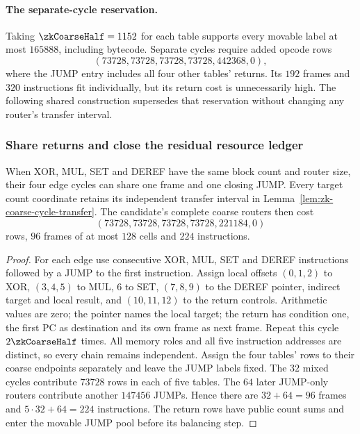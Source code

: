 \paragraph{The separate-cycle reservation.} Taking $\zkCoarseHalf=1152$ for each table supports every movable label at most $165888$, including bytecode. Separate cycles require added opcode rows
\[
 (73728,73728,73728,73728,442368,0),
\]
where the JUMP entry includes all four other tables' returns. Its $192$ frames and $320$ instructions fit individually, but its return cost is unnecessarily high. The following shared construction supersedes that reservation without changing any router's transfer interval.

\subsubsection{Share returns and close the residual resource ledger}

\begin{proposition}\label{prop:zk-shared-coarse-routers}
When XOR, MUL, SET and DEREF have the same block count and router size, their four edge cycles can share one frame and one closing JUMP. Every target count coordinate retains its independent transfer interval in Lemma~\ref{lem:zk-coarse-cycle-transfer}. The candidate's complete coarse routers then cost
\[
 (73728,73728,73728,73728,221184,0)
\]
rows, $96$ frames of at most $128$ cells and $224$ instructions.
\end{proposition}
\begin{proof}
For each edge use consecutive XOR, MUL, SET and DEREF instructions followed by a JUMP to the first instruction. Assign local offsets $(0,1,2)$ to XOR, $(3,4,5)$ to MUL, $6$ to SET, $(7,8,9)$ to the DEREF pointer, indirect target and local result, and $(10,11,12)$ to the return controls. Arithmetic values are zero; the pointer names the local target; the return has condition one, the first PC as destination and its own frame as next frame. Repeat this cycle $2\zkCoarseHalf$ times. All memory roles and all five instruction addresses are distinct, so every chain remains independent. Assign the four tables' rows to their coarse endpoints separately and leave the JUMP labels fixed. The $32$ mixed cycles contribute $73728$ rows in each of five tables. The $64$ later JUMP-only routers contribute another $147456$ JUMPs. Hence there are $32+64=96$ frames and $5\cdot32+64=224$ instructions. The return rows have public count sums and enter the movable JUMP pool before its balancing step.
\end{proof}

